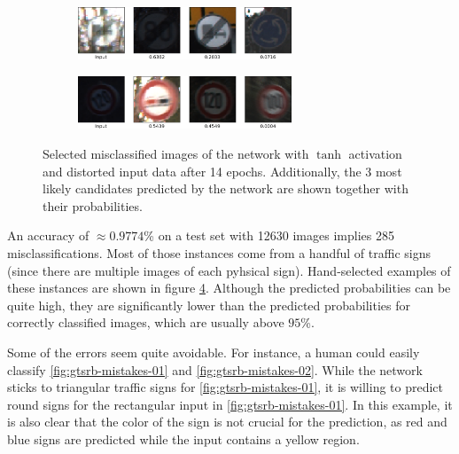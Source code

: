 \documentclass[11pt, a4paper]{article}
\begin{document}
\begin{figure}
\begin{subfigure}{\textwidth}
		\label{fig:gtsrb-mistakes-05}
	\end{subfigure}
	\begin{subfigure}{\textwidth}
		\centering
		\caption{}
		\includegraphics[width=0.7\textwidth]{gtsrb_mistakes/mistake_ueberholen_lkw.png}
		\label{fig:gtsrb-mistakes-06}
	\end{subfigure}
	\begin{subfigure}{\textwidth}
		\centering
		\caption{}
		\includegraphics[width=0.7\textwidth]{gtsrb_mistakes/mistake_limit_120.png}
		\label{fig:gtsrb-mistakes-07}
	\end{subfigure}
	\caption{Selected misclassified images of the network with $\tanh$ activation and distorted input data after 14 epochs. Additionally, the 3 most likely candidates predicted by the network are shown together with their probabilities.}
	\label{fig:gtsrb-mistakes}
\end{figure}

An accuracy of $\approx 0.9774$\% on a test set with 12630 images implies 285 misclassifications. Most of those instances come from a handful of traffic signs (since there are multiple images of each pyhsical sign). Hand-selected examples of these instances are shown in figure \ref{fig:gtsrb-mistakes}. Although the predicted probabilities can be quite high, they are significantly lower than the predicted probabilities for correctly classified images, which are usually above $95$\%.

Some of the errors seem quite avoidable. For instance, a human could easily classify \ref{fig:gtsrb-mistakes-01} and \ref{fig:gtsrb-mistakes-02}. While the network sticks to triangular traffic signs for \ref{fig:gtsrb-mistakes-01}, it is willing to predict round signs for the rectangular input in \ref{fig:gtsrb-mistakes-01}. In this example, it is also clear that the color of the sign is not crucial for the prediction, as red and blue signs are predicted while the input contains a yellow region.
\end{document}
